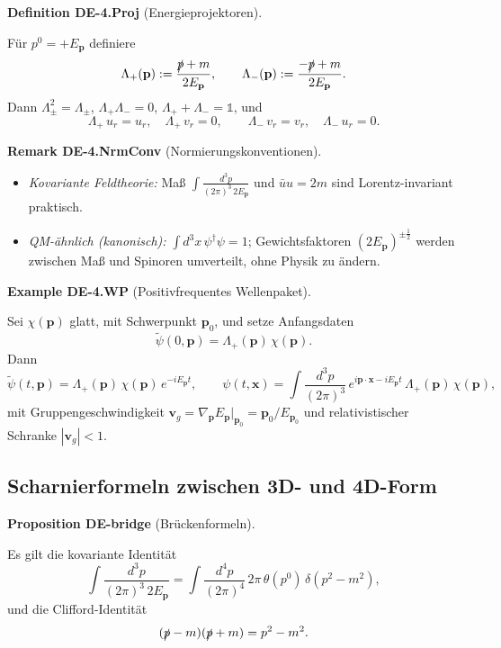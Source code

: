 \documentclass[10pt, letterpaper]{article}
\newcommand{\CustomHeading}[3]{%
  \par\medskip\noindent%
  \textbf{#1 #2} \textnormal{(#3)}.\enskip%
}
\newenvironment{DEF}[2]{\begin{unitbox}\CustomHeading{Definition}{#1}{#2}}{\end{unitbox}}
\newenvironment{PROP}[2]{\begin{unitbox}\CustomHeading{Proposition}{#1}{#2}}{\end{unitbox}}
\newenvironment{REM}[2]{\begin{unitbox}\CustomHeading{Remark}{#1}{#2}}{\end{unitbox}}
\newenvironment{EXA}[2]{\begin{unitbox}\CustomHeading{Example}{#1}{#2}}{\end{unitbox}}
\begin{document}
\begin{DEF}{DE-4.Proj}{Energieprojektoren}
Für $p^0=+E_{\mathbf p}$ definiere
\[
\Lambda_+(\mathbf p):=\frac{\slashed p+m}{2E_{\mathbf p}},\qquad
\Lambda_-(\mathbf p):=\frac{-\slashed p+m}{2E_{\mathbf p}}.
\]
Dann $\Lambda_\pm^2=\Lambda_\pm$, $\Lambda_+\Lambda_-=0$, $\Lambda_++\Lambda_-=\mathbb 1$, und
\[
\Lambda_+\,u_r=u_r,\quad \Lambda_+\,v_r=0,\qquad
\Lambda_-\,v_r=v_r,\quad \Lambda_-\,u_r=0.
\]
\end{DEF}

\begin{REM}{DE-4.NrmConv}{Normierungskonventionen}
\begin{itemize}
\item \emph{Kovariante Feldtheorie:} Maß $\displaystyle \int\!\frac{d^3p}{(2\pi)^3\,2E_{\mathbf p}}$ und $\bar uu=2m$ sind Lorentz-invariant praktisch.
\item \emph{QM-ähnlich (kanonisch):} $\displaystyle \int d^3x\,\psi^\dagger\psi=1$; Gewichtsfaktoren $(2E_{\mathbf p})^{\pm\frac12}$ werden zwischen Maß und Spinoren umverteilt, ohne Physik zu ändern.
\end{itemize}
\end{REM}

\begin{EXA}{DE-4.WP}{Positivfrequentes Wellenpaket}
Sei $\chi(\mathbf p)$ glatt, mit Schwerpunkt $\mathbf p_0$, und setze Anfangsdaten
\[
\tilde\psi(0,\mathbf p)=\Lambda_+(\mathbf p)\,\chi(\mathbf p).
\]
Dann
\[
\tilde\psi(t,\mathbf p)=\Lambda_+(\mathbf p)\,\chi(\mathbf p)\,e^{-iE_{\mathbf p}t},\qquad
\psi(t,\mathbf x)=\int\!\frac{d^3p}{(2\pi)^3}\,e^{i\mathbf p\cdot\mathbf x-iE_{\mathbf p}t}\,\Lambda_+(\mathbf p)\,\chi(\mathbf p),
\]
mit Gruppengeschwindigkeit $\mathbf v_g=\nabla_{\mathbf p}E_{\mathbf p}\big|_{\mathbf p_0}=\mathbf p_0/E_{\mathbf p_0}$ und relativistischer Schranke $|\mathbf v_g|<1$.
\end{EXA}

\subsection{Scharnierformeln zwischen 3D- und 4D-Form}

\begin{PROP}{DE-bridge}{Brückenformeln}
Es gilt die kovariante Identität
\[
\int\!\frac{d^3p}{(2\pi)^3\,2E_{\mathbf p}}=\int\!\frac{d^4p}{(2\pi)^4}\,2\pi\,\theta(p^0)\,\delta(p^2-m^2),
\]
und die Clifford-Identität
\[
(\slashed p-m)(\slashed p+m)=p^2-m^2.
\]
\end{PROP}
\end{document}
